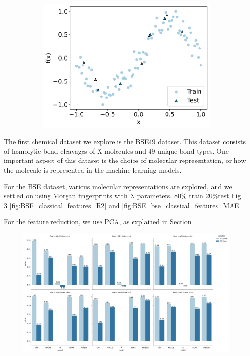 \documentclass[journal=jacsat,manuscript=article]{achemso}
\begin{document}
\begin{figure}[H]
\begin{subfigure}[b]{0.3\textwidth}
		\centering
		\includegraphics[width=\textwidth]{../images/Function_Fitting/function_dataset/sine_train_vs_test.png}
		\caption{}
		\label{fig:sine_train_vs_test}
	\end{subfigure}
	\caption{}
	\label{fig:train_vs_test}
\end{figure}


The first chemical dataset we explore is the BSE49 dataset. 
This dataset consists of homolytic bond cleavages of X molecules and 49 unique bond types.
One important aspect of this dataset is the choice of molecular representation, or how the molecule is represented in the machine learning models.





For the BSE dataset, various molecular representations are explored, and we settled on using Morgan fingerprints with X parameters. 
80\% train 20\%test Fig. \ref{fig:classicalfuncfit} 
\ref{fig:BSE_classical_features_R2} and \ref{fig:BSE_bse_classical_features_MAE}

For the feature reduction, we use PCA, as explained in Section

\begin{figure}[H]
	\centering	
	\includegraphics[width=\linewidth]{../classical_testing/BSE/classical_funcfit}
	\caption{}
	\label{fig:classicalfuncfit}
\end{figure}
\end{document}
